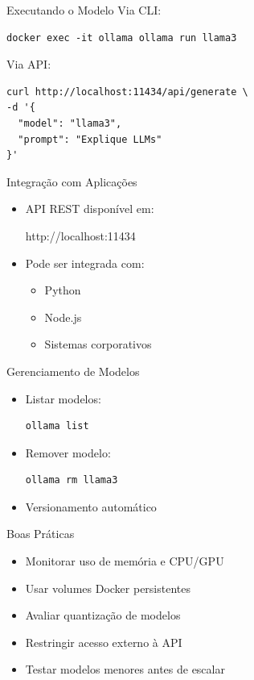 \documentclass{beamer}
\begin{document}
\begin{frame}[fragile]{Executando o Modelo}
Via CLI:

\begin{verbatim}
docker exec -it ollama ollama run llama3
\end{verbatim}

Via API:

\begin{verbatim}
curl http://localhost:11434/api/generate \
-d '{
  "model": "llama3",
  "prompt": "Explique LLMs"
}'
\end{verbatim}
\end{frame}

\begin{frame}{Integração com Aplicações}
    \begin{itemize}
        \item API REST disponível em:
        \begin{center}
        http://localhost:11434
        \end{center}
        \item Pode ser integrada com:
        \begin{itemize}
            \item Python
            \item Node.js
            \item Sistemas corporativos
        \end{itemize}
    \end{itemize}
\end{frame}

\begin{frame}[fragile]{Gerenciamento de Modelos}
    \begin{itemize}
        \item Listar modelos:
\begin{verbatim}
ollama list
\end{verbatim}
        \item Remover modelo:
\begin{verbatim}
ollama rm llama3
\end{verbatim}
        \item Versionamento automático
    \end{itemize}
\end{frame}

\begin{frame}{Boas Práticas}
    \begin{itemize}
        \item Monitorar uso de memória e CPU/GPU
        \item Usar volumes Docker persistentes
        \item Avaliar quantização de modelos
        \item Restringir acesso externo à API
        \item Testar modelos menores antes de escalar
    \end{itemize}
\end{frame}
\end{document}
